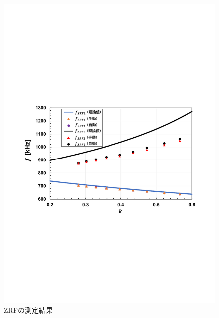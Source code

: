 \begin{figure}[p]
\begin{center}
\includegraphics[width=140mm]{figures/tracking1.pdf}
\caption{ZRFの測定結果}
\label{tracking1}
\vspace{1cm}


\end{center}
\end{figure}
